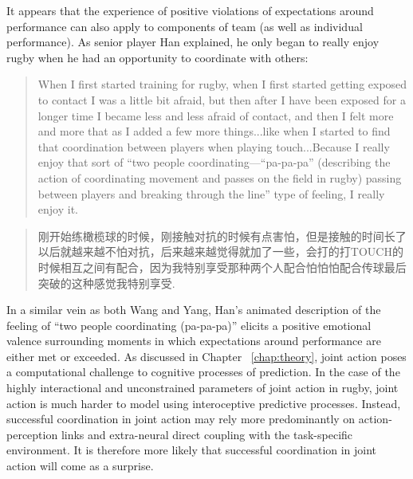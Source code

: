 \begin{CJK}{UTF8}{gbsn}
It appears that the experience of positive violations of expectations around performance can also apply to components of team (as well as individual performance).  As senior player Han explained, he only began to really enjoy rugby when he had an opportunity to coordinate with others:

\begin{quote}
    When I first started training for rugby, when I first started getting exposed to contact I was a little bit afraid, but then after I have been exposed for a longer time I became less and less afraid of contact, and then I felt more and more that as I added a few more things...like when I started to find that coordination between players when playing touch...Because I really enjoy that sort of ``two people coordinating---``pa-pa-pa'' (describing the action of coordinating movement and passes on the field in rugby) passing between players and breaking through the line'' type of feeling, I really enjoy it.
\end{quote}

\begin{quote}
  	刚开始练橄榄球的时候，刚接触对抗的时候有点害怕，但是接触的时间长了以后就越来越不怕对抗，后来越来越觉得就加了一些，会打的打TOUCH的时候相互之间有配合，因为我特别享受那种两个人配合怕怕怕配合传球最后突破的这种感觉我特别享受.
\end{quote}

In a similar vein as both Wang and Yang, Han's animated description of the feeling of ``two people coordinating (pa-pa-pa)'' elicits a positive emotional valence surrounding moments in which expectations around performance are either met or exceeded.  As discussed in Chapter ~\ref{chap:theory}, joint action poses a computational challenge to cognitive processes of prediction.   In the case of the highly interactional and unconstrained parameters of joint action in rugby, joint action is much harder to model using interoceptive predictive processes.  Instead, successful coordination in joint action may rely more predominantly on action-perception links and extra-neural direct coupling with the task-specific environment. It is therefore more likely that successful coordination in joint action will come as a surprise.


\end{CJK}
